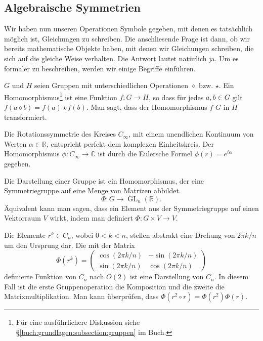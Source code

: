 \subsection{Algebraische Symmetrien}
Wir haben nun unseren Operationen Symbole gegeben, mit denen es tatsächlich
möglich ist, Gleichungen zu schreiben.  Die anschliesende Frage ist dann, ob wir
bereits mathematische Objekte haben, mit denen wir Gleichungen schreiben, die
sich auf die gleiche Weise verhalten. Die Antwort lautet natürlich ja.  Um es
formaler zu beschreiben, werden wir einige Begriffe einführen.
\begin{definition}[Gruppenhomomorphismus]
	\(G\) und \(H\) seien  Gruppen mit unterschiedlichen Operationen \(\diamond\)
	bzw.  \(\star\). Ein Homomorphismus\footnote{ Für eine ausführlichere
	Diskussion siehe \S\ref{buch:grundlagen:subsection:gruppen} im Buch.} ist
	eine Funktion \(f: G \to H\), so dass für jedes \(a, b \in G\) gilt
	\(f(a\diamond b) = f(a) \star f(b)\).  Man sagt, dass der Homomorphismus
	\(f\) \(G\) in \(H\) transformiert.
\end{definition}
\begin{beispiel}
	Die Rotationssymmetrie des Kreises \(C_\infty\), mit einem unendlichen
	Kontinuum von Werten \(\alpha \in \mathbb{R}\), entspricht perfekt dem
	komplexen Einheitskreis. Der Homomorphismus \(\phi: C_\infty \to \mathbb{C}\)
	ist durch die Eulersche Formel \(\phi(r) = e^{i\alpha}\) gegeben.
\end{beispiel}

\begin{definition}
	Die Darstellung einer Gruppe ist ein Homomorphismus, der eine Symmetriegruppe
	auf eine Menge von Matrizen abbildet.
	\[
		\Phi: G \to \operatorname{GL}_n(\mathbb{R}).
	\]
	Äquivalent kann man sagen, dass ein Element aus der Symmetriegruppe auf einen
	Vektorraum \(V\) wirkt, indem man definiert \(\Phi : G \times V \to V\).
\end{definition}
\begin{beispiel}
	Die Elemente \(r^k \in C_n\), wobei \(0 < k < n\), stellen abstrakt eine
	Drehung von \(2\pi k/n\) um den Ursprung dar. Die mit der Matrix 
	\[
		\Phi(r^k) = \begin{pmatrix}
			\cos(2\pi k/n) & -\sin(2\pi k/n) \\
			\sin(2\pi k/n) &  \cos(2\pi k/n)
		\end{pmatrix}
	\]
	definierte Funktion von \(C_n\) nach \(O(2)\) ist eine Darstellung von
	\(C_n\). In diesem Fall ist die erste Gruppenoperation die Komposition und
	die zweite die Matrixmultiplikation. Man kann überprüfen, dass \(\Phi(r^2
	\circ r) = \Phi(r^2)\Phi(r)\).
\end{beispiel}

